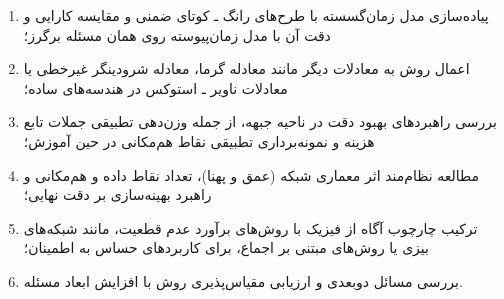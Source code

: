 \begin{enumerate}
\item پیاده‌سازی مدل زمان‌گسسته با طرح‌های رانگ ـ کوتای ضمنی و مقایسه
کارایی و دقت آن با مدل زمان‌پیوسته روی همان مسئله برگرز؛

\item اعمال روش به معادلات دیگر مانند معادله گرما، معادله شرودینگر غیرخطی
یا معادلات ناویر ـ استوکس در هندسه‌های ساده؛

\item بررسی راهبردهای بهبود دقت در ناحیه جبهه، از جمله وزن‌دهی تطبیقی
جملات تابع هزینه و نمونه‌برداری تطبیقی نقاط هم‌مکانی در حین آموزش؛

\item مطالعه نظام‌مند اثر معماری شبکه (عمق و پهنا)، تعداد نقاط داده و
هم‌مکانی و راهبرد بهینه‌سازی بر دقت نهایی؛

\item ترکیب چارچوب آگاه از فیزیک با روش‌های برآورد عدم قطعیت، مانند
شبکه‌های بیزی یا روش‌های مبتنی بر اجماع، برای کاربردهای حساس به اطمینان؛

\item بررسی مسائل دوبعدی و ارزیابی مقیاس‌پذیری روش با افزایش ابعاد مسئله.
\end{enumerate}
